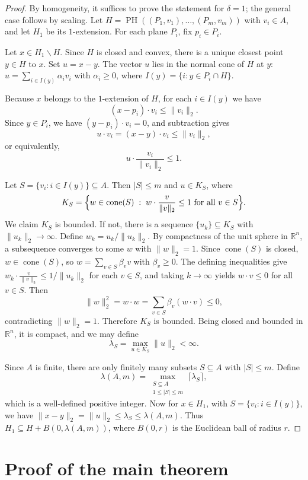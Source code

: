 \documentclass{amsart}
\theoremstyle{definition}
\newcommand{\R}{\mathbb R}
\newcommand{\norm}[1]{\lVert#1\rVert}
\DeclareMathOperator{\cone}{cone}
\begin{document}
\begin{proof}
By homogeneity, it suffices to prove the statement for $\delta=1$; the
general case follows by scaling. Let
$H=\operatorname{PH}((P_1,v_1),\dots,(P_m,v_m))$ with $v_i\in A$, and
let $H_1$ be its $1$-extension. For each plane $P_i$, fix $p_i\in P_i$.

Let $x\in H_1\backslash H$. Since $H$ is closed and convex, there is a unique closest
point $y\in H$ to $x$. Set $u=x-y$. The vector
$u$ lies in the normal cone of $H$ at $y$:
$u=\sum_{i\in I(y)}\alpha_i v_i$ with $\alpha_i\geq 0$, where
$I(y)=\{i\colon y\in P_i\cap H\}$.

Because $x$ belongs to the $1$-extension of $H$, for each $i\in I(y)$
we have
\[
(x-p_i)\cdot v_i\leq \|v_i\|_2.
\]
Since $y\in P_i$, we have $(y-p_i)\cdot v_i=0$, and subtraction gives
\[
u\cdot v_i = (x-y)\cdot v_i \le \norm{v_i}_2,
\]
or equivalently,
\[
u\cdot \frac{v_i}{\norm{v_i}_2} \le 1.
\]

Let $S=\{v_i\colon i\in I(y)\}\subseteq A$. Then $|S|\leq m$ and
$u\in K_S$, where
\[
K_S=\Bigl\{w\in\cone(S)\;:\;
w\cdot\frac{v}{\|v\|_2}\leq 1\text{ for all }v\in S\Bigr\}.
\]
We claim $K_S$ is bounded. If not, there is a sequence
$\{u_k\}\subseteq K_S$ with $\|u_k\|_2\to\infty$. Define
$w_k=u_k/\|u_k\|_2$. By compactness of the unit sphere in $\mathbb{R}^n$,
a subsequence converges to some $w$ with $\|w\|_2=1$. Since $\cone(S)$
is closed, $w\in\cone(S)$, so $w=\sum_{v\in S}\beta_v v$ with
$\beta_v\geq 0$. The defining inequalities give
$w_k\cdot\frac{v}{\|v\|_2}\leq 1/\|u_k\|_2$ for each $v\in S$, and
taking $k\to\infty$ yields $w\cdot v\leq 0$ for all $v\in S$. Then
\[
\|w\|_2^2=w\cdot w=\sum_{v\in S}\beta_v(w\cdot v)\leq 0,
\]
contradicting $\|w\|_2=1$. Therefore $K_S$ is bounded. Being closed and bounded in $\R^n$, it is compact, and we may define $$\lambda_S = \max_{u\in K_S}\norm{u}_2 < \infty.$$

Since $A$ is finite, there are only finitely many subsets
$S\subseteq A$ with $|S|\leq m$. Define
\[
\lambda(A,m)=\max_{\substack{S\subseteq A\\ 1\leq |S|\leq m}}
\lceil\lambda_S\rceil,
\]
which is a well-defined positive integer. Now for $x\in H_1$, with
$S=\{v_i\colon i\in I(y)\}$, we have
$\|x-y\|_2=\|u\|_2\leq\lambda_S\leq\lambda(A,m)$. Thus
$H_1\subseteq H+B(0,\lambda(A,m))$, where $B(0,r)$ is the Euclidean
ball of radius $r$.
\end{proof}

\section{Proof of the main theorem}\label{sec:proof}
\end{document}
